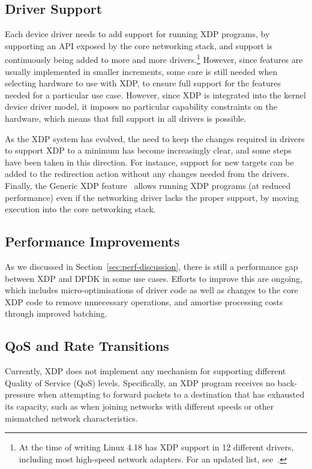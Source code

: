 \documentclass[sigconf]{acmart}
\begin{document}
\subsection{Driver Support}
\label{sec:driver-support}
Each device driver needs to add support for running XDP programs, by supporting
an API exposed by the core networking stack, and support is continuously being
added to more and more drivers.\footnote{At the time of writing Linux 4.18 has
  XDP support in 12 different drivers, including most high-speed network
  adapters. For an updated list, see~\cite{cilium-docs}.} However, since
features are usually implemented in smaller increments, some care is still
needed when selecting hardware to use with XDP, to ensure full support for the
features needed for a particular use case. However, since XDP is integrated into
the kernel device driver model, it imposes no particular capability constraints
on the hardware, which means that full support in all drivers is possible.

As the XDP system has evolved, the need to keep the changes required in drivers
to support XDP to a minimum has become increasingly clear, and some steps have
been taken in this direction. For instance, support for new targets can be added
to the redirection action without any changes needed from the drivers. Finally,
the Generic XDP feature~\cite{generic-xdp} allows running XDP programs (at
reduced performance) even if the networking driver lacks the proper support, by
moving execution into the core networking stack.

\subsection{Performance Improvements}
\label{sec:perf-improvements}
As we discussed in Section~\ref{sec:perf-discussion}, there is still a
performance gap between XDP and DPDK in some use cases. Efforts to improve this
are ongoing, which includes micro-optimisations of driver code as well as
changes to the core XDP code to remove unnecessary operations, and amortise
processing costs through improved batching.

\subsection{QoS and Rate Transitions}
\label{sec:handl-rate-trans}
Currently, XDP does not implement any mechanism for supporting different Quality
of Service (QoS) levels. Specifically, an XDP program receives no back-pressure
when attempting to forward packets to a destination that has exhausted its
capacity, such as when joining networks with different speeds or other
mismatched network characteristics.
\end{document}
